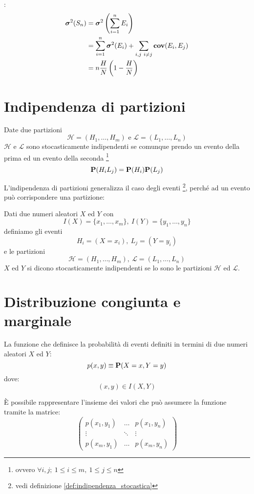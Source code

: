 :
\begin{align*}
  \var(S_n) &= \var \left(\sum_{i = 1}^n E_i\right) \\
  &= \sum_{i = 1}^n \var(E_i) + \sum_{i,j ~ i \neq j} \cov(E_i, E_j) \\ %
  &= n \frac{H}{N} \left( 1 - \frac{H}{N} \right)
\end{align*}

\section{Indipendenza di partizioni} %
\begin{definition}
  \label{def:indipendenza_di_partizioni}
  Date due partizioni
  \[
    \mathcal{H} = (H_1, \ldots, H_m) \text{ e } \mathcal{L} = (L_1, \ldots, L_n)
  \]
  \( \mathcal{H} \) e \( \mathcal{L} \) sono stocasticamente indipendenti se comunque prendo un evento della prima ed un evento della seconda
  \footnote{ovvero \( \forall i, j; ~ 1 \le i \le m, ~ 1 \le j \le n \)}
  \[
    \mathbf{P}(H_i L_j) = \mathbf{P}(H_i) \mathbf{P}(L_j)
  \]
\end{definition}

L'indipendenza di partizioni generalizza il caso degli eventi
\footnote{vedi definizione \ref{def:indipendenza_stocastica}},
perché ad un evento può corrispondere una partizione:
\begin{definition}
  Dati due numeri aleatori \( X \) ed \( Y \) con
  \[
    I(X) = \{ x_1, \ldots, x_m \}, ~ I(Y) = \{ y_1, \ldots, y_n \}
  \]
  definiamo gli eventi
  \[
    H_i = (X = x_i), ~ L_j = (Y = y_i)
  \]
  e le partizioni
  \[
    \mathcal{H} = (H_1, \ldots, H_m), ~ \mathcal{L} = (L_1, \ldots, L_n)
  \]
  \( X \) ed \( Y \) si dicono stocasticamente indipendenti se lo sono le partizioni \( \mathcal{H} \) ed \( \mathcal{L} \).
\end{definition}

\section{Distribuzione congiunta e marginale} %
\begin{definition}
  \label{def:distribuzione_congiunta}
  La funzione che definisce la probabilità di eventi definiti in termini di due numeri aleatori \( X \) ed \( Y \):
  \[
    p(x,y) \equiv \mathbf{P}(X = x, Y = y)
  \]
  dove:
  \[
    (x,y) \in I(X,Y)
  \]
\end{definition}
È possibile rappresentare l'insieme dei valori che può assumere la funzione tramite la matrice:
\[
  \begin{pmatrix}
    p(x_1, y_1) & \dots & p(x_1, y_n) \\
    \vdots & \ddots & \vdots \\
    p(x_m, y_1) & \dots & p(x_m, y_n)
  \end{pmatrix}
\]

